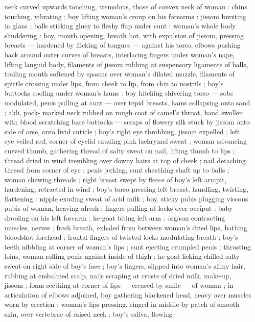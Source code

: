 neck curved upwards touching, tremulous, those of convex neck of
woman : chins touching, vibrating ; boy lifting woman's croup on his
forearms : jissom bursting in glans ; balls sticking gluey to fleshy flap
under cunt : woman's whole body shuddering : boy, mouth opening,
breath hot, with expulsion of jissom, pressing breasts --- hardened
by flicking of tongues --- against his torso, elbows pushing back
around outer curves of breasts, interlacing fingers under woman's
nape, lifting languid body, filaments of jissom rubbing at suspensory
ligaments of balls, trailing mouth softened by spasms over woman's
dilated muzzle, filaments of spittle crossing under lips, from cheek to
lip, from chin to nostrils ; boy's buttocks cooling under woman's
hams : boy hitching shivering torso --- sobs modulated, penis pulling
at cunt --- over tepid breasts, hams collapsing onto sand ; akli, pock-
marked neck rubbed on rough coat of camel's throat, hand swollen
with blood scratching bare buttocks --- scraps of flowery silk stuck
by jissom onto side of arse, onto livid cuticle ; boy's right eye
throbbing, jissom expelled ; left eye veiled red, corner of eyelid
exuding pink lachrymal sweat ; woman advancing curved thumb,
gathering thread of salty sweat on nail, lifting thumb to lips ; thread
dried in wind trembling over downy hairs at top of cheek ; nail
detaching thread from corner of eye ; penis jerking, cunt sheathing
shaft up to balls ; woman chewing threads ; right breast swept by
fleece of boy's left armpit, hardening, retracted in wind ; boy's torso
pressing left breast, handling, twisting, flattening : nipple exuding
sweat of acid milk ; boy, sticky pubis plugging viscous pubis of
woman, heaving afresh ; fingers pulling at locks over occiput ; baby
drooling on his left forearm ; he-goat biting left arm : orgasm
contracting muscles, nerves ; fresh breath, exhaled from between
woman's dried lips, bathing bloodshot forehead ; frontal fingers of
twisted locks modulating breath ; boy's teeth nibbling at corner of
woman's lips ; cunt ejecting crumpled penis ; thrusting loins, woman
rolling penis against inside of thigh ; he-goat licking chilled salty
sweat on right side of boy's face ; boy's fingers, slipped into
woman's slimy hair, rubbing at embalmed scalp, nails scraping at
crusts of dried milk, make-up, jissom ; foam seething at corner of
lips --- creased by smile --- of woman ; in articulation of elbows
adjoined, boy gathering blackened head, heavy over muscles worn
by erection ; woman's lips pressing, ringed in middle by patch of
smooth skin, over vertebrae of raised neck ; boy's saliva, flowing
